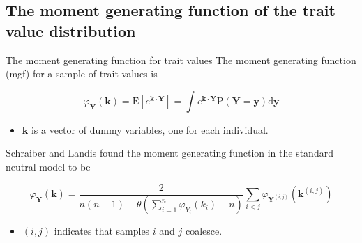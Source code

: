 \documentclass{beamer}
\newcommand{\E}{\mathrm{E}}
\newcommand{\Pro}{\mathrm{P}}
\begin{document}
\subsection{The moment generating function of the trait value distribution}

\begin{frame}{The moment generating function for trait values}
  The moment generating function (mgf) for a sample of trait values is 
  \begin{definition}
    \begin{equation*}
      \varphi_{\mathbf{Y}}(\mathbf{k}) = \E\left[ e^{\mathbf{k} \cdot \mathbf{Y}} \right] =
      \int e^{\mathbf{k} \cdot \mathbf{Y}} \Pro(\mathbf{Y}=\mathbf{y}) \mbox{d}\mathbf{y}
    \end{equation*}
    \begin{itemize}
    \item $\mathbf{k}$ is a vector of dummy variables, one for each individual.
    \end{itemize}
  \end{definition}
  Schraiber and Landis found the moment generating function in the standard neutral model to be
  \begin{block}{}
    \begin{equation*}
      \varphi_{\mathbf{Y}}(\mathbf{k}) = \frac{2}{n(n-1) - \theta \left( \sum_{i=1}^n \varphi_{Y_i}(k_i) - n \right)}
      \sum_{i<j} \varphi_{\mathbf{Y}^{(i,j)}}(\mathbf{k}^{(i,j)})
    \end{equation*}
    \begin{itemize}
    \item $(i,j)$ indicates that samples $i$ and $j$ coalesce.
    \end{itemize}
  \end{block}
\end{frame}
\end{document}
